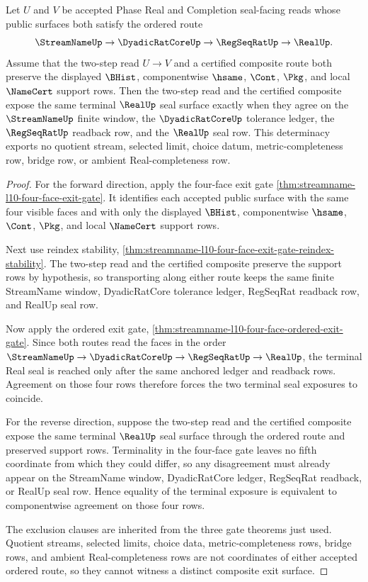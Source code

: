 \begin{theorem}
\label{thm:streamname-l10-ordered-exit-composition-determinacy}
Let $U$ and $V$ be accepted Phase Real and Completion seal-facing reads whose public surfaces both satisfy the ordered route
$$
\StreamNameUp \to \DyadicRatCoreUp \to \RegSeqRatUp \to \RealUp .
$$
Assume that the two-step read $U \to V$ and a certified composite route both preserve the displayed $\BHist$, componentwise $\hsame$, $\Cont$, $\Pkg$, and local $\NameCert$ support rows. Then the two-step read and the certified composite expose the same terminal $\RealUp$ seal surface exactly when they agree on the $\StreamNameUp$ finite window, the $\DyadicRatCoreUp$ tolerance ledger, the $\RegSeqRatUp$ readback row, and the $\RealUp$ seal row. This determinacy exports no quotient stream, selected limit, choice datum, metric-completeness row, bridge row, or ambient Real-completeness row.
\end{theorem}
\begin{proof}
For the forward direction, apply the four-face exit gate \autoref{thm:streamname-l10-four-face-exit-gate}. It identifies each accepted public surface with the same four visible faces and with only the displayed $\BHist$, componentwise $\hsame$, $\Cont$, $\Pkg$, and local $\NameCert$ support rows.

Next use reindex stability, \autoref{thm:streamname-l10-four-face-exit-gate-reindex-stability}. The two-step read and the certified composite preserve the support rows by hypothesis, so transporting along either route keeps the same finite StreamName window, DyadicRatCore tolerance ledger, RegSeqRat readback row, and RealUp seal row.

Now apply the ordered exit gate, \autoref{thm:streamname-l10-four-face-ordered-exit-gate}. Since both routes read the faces in the order $\StreamNameUp \to \DyadicRatCoreUp \to \RegSeqRatUp \to \RealUp$, the terminal Real seal is reached only after the same anchored ledger and readback rows. Agreement on those four rows therefore forces the two terminal seal exposures to coincide.

For the reverse direction, suppose the two-step read and the certified composite expose the same terminal $\RealUp$ seal surface through the ordered route and preserved support rows. Terminality in the four-face gate leaves no fifth coordinate from which they could differ, so any disagreement must already appear on the StreamName window, DyadicRatCore ledger, RegSeqRat readback, or RealUp seal row. Hence equality of the terminal exposure is equivalent to componentwise agreement on those four rows.

The exclusion clauses are inherited from the three gate theorems just used. Quotient streams, selected limits, choice data, metric-completeness rows, bridge rows, and ambient Real-completeness rows are not coordinates of either accepted ordered route, so they cannot witness a distinct composite exit surface.
\end{proof}

